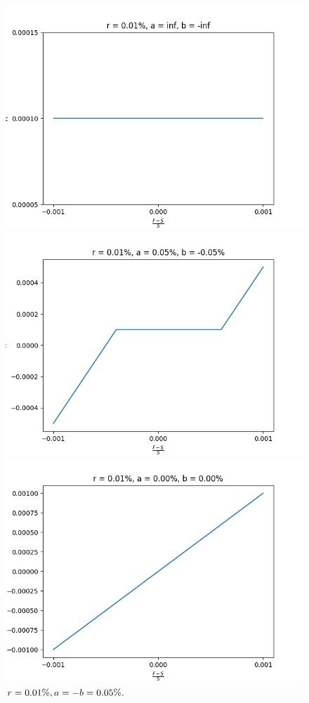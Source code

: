 \documentclass[10pt]{article}
\begin{document}
\begin{figure}[!htb]
  \includegraphics[width=\linewidth]{./plots/r_0.0001_a_inf_b_-inf.png}
  \caption{$\\r=0.01\%, a=-b=\infty.$}\label{fig:clamp1}
\endminipage\hfill
{}
  \includegraphics[width=\linewidth]{./plots/r_0.0001_a_0.0005_b_-0.0005.png}
  \caption{$\\r=0.01\%, a=-b=0.05\%.$}\label{fig:clamp22}
\endminipage\hfill
{}%
  \includegraphics[width=\linewidth]{./plots/r_0.0001_a_0_b_0.png}

\end{figure}
\end{document}
